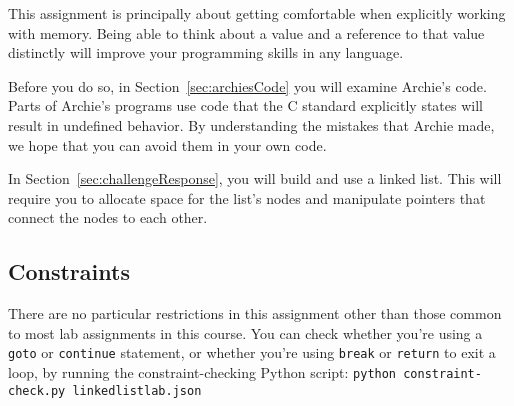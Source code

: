 This assignment is principally about getting comfortable when explicitly working with memory.
Being able to think about a value and a reference to that value distinctly will improve your programming skills in any language.

Before you do so, in Section~\ref{sec:archiesCode} you will examine Archie's code.
Parts of Archie's programs use code that the C standard explicitly states will result in undefined behavior.
By understanding the mistakes that Archie made, we hope that you can avoid them in your own code.

In Section~\ref{sec:challengeResponse}, you will build and use a linked list.
This will require you to allocate space for the list's nodes and manipulate pointers that connect the nodes to each other.

\subsection{Constraints}

There are no particular restrictions in this assignment other than those common to most lab assignments in this course.
    You can check whether you're using a \lstinline{goto} or \lstinline{continue} statement, or whether you're using \lstinline{break} or \lstinline{return} to exit a loop, by running the constraint-checking Python script:
    \texttt{python constraint-check.py linkedlistlab.json}
